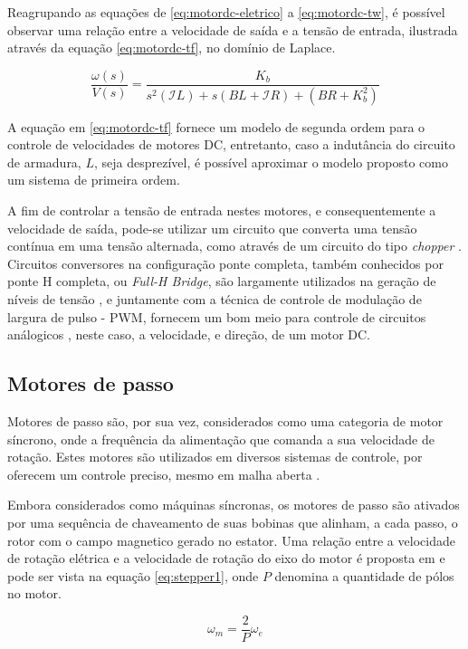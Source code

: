 Reagrupando as equações de \ref{eq:motordc-eletrico} a \ref{eq:motordc-tw},
é possível observar uma relação entre a velocidade de saída e a tensão
de entrada, ilustrada através da equação \ref{eq:motordc-tf}, no domínio 
de Laplace.

\begin{equation}
    \label{eq:motordc-tf}
    \frac{\omega(s)}{V(s)} = \frac{K_b}{s^2(\mathcal{I}L)+s(BL+\mathcal{I}R)+(BR+K_b^2)}
\end{equation}

A equação em \ref{eq:motordc-tf} fornece um modelo de segunda ordem para
o controle de velocidades de motores DC, entretanto, caso a indutância
do circuito de armadura, $L$, seja desprezível, é possível aproximar 
o modelo proposto como um sistema de primeira ordem.

A fim de controlar a tensão de entrada nestes motores, e consequentemente 
a velocidade de saída, pode-se utilizar um circuito que converta uma tensão
contínua em uma tensão alternada, como através de um circuito do tipo 
\textit{chopper} \cite{krishnan2001electric}.
Circuitos conversores na configuração ponte completa, também conhecidos por 
ponte H completa, ou \textit{Full-H Bridge}, são largamente utilizados na 
geração de níveis de tensão \cite{rashid2017power}, e juntamente com a técnica de controle de 
modulação de largura de pulso - PWM, fornecem um bom meio para controle de 
circuitos análogicos \cite{barr2001pulse}, neste caso, a velocidade, e direção, de um motor DC.

\subsection{Motores de passo}
Motores de passo são, por sua vez, considerados como uma categoria de
motor síncrono, onde a frequência da alimentação que comanda a sua 
velocidade de rotação. Estes motores são utilizados em diversos sistemas
de controle, por oferecem um controle preciso, mesmo em malha 
aberta \cite{chapman2005electric}.  

Embora considerados como máquinas síncronas, os motores de passo são
ativados por uma sequência de chaveamento de suas bobinas que alinham,
a cada passo, o rotor com o campo magnetico gerado no estator. Uma 
relação entre a velocidade de rotação elétrica e a velocidade de rotação do
eixo do motor é proposta em \cite{chapman2005electric} e pode ser vista
na equação \ref{eq:stepper1}, onde $P$ denomina a quantidade de pólos
no motor. 

\begin{equation}
    \label{eq:stepper1}
    \omega_m = \frac{2}{P}\omega_e
\end{equation}

